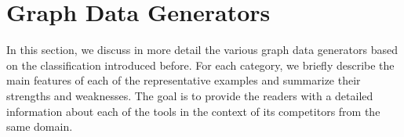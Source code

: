 \section{Graph Data Generators}
\label{sec:generators}

In this section, we discuss in more detail the various graph data generators based on the classification introduced before. For each category, we briefly describe the main features of each of the representative examples and summarize their strengths and weaknesses. The goal is to provide the readers with a detailed information about each of the tools in the context of its competitors from the same domain.










%






